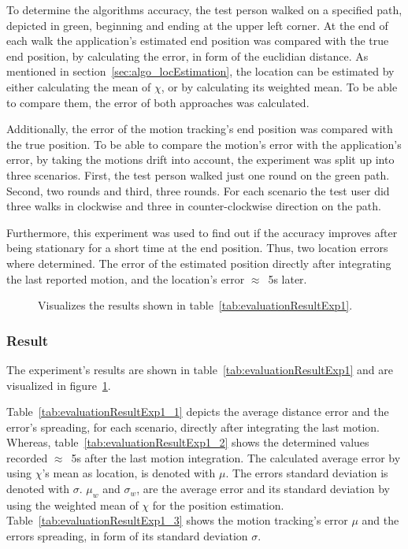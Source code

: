 To determine the algorithms accuracy, the test person walked on a specified path, depicted in green, beginning and ending at the upper left corner. At the end of each walk the application's estimated end position was compared with the true end position, by calculating the error, in form of the euclidian distance. As mentioned in section~\ref{sec:algo_locEstimation}, the location can be estimated by either calculating the mean of $\chi$, or by calculating its weighted mean. To be able to compare them, the error of both approaches was calculated.

Additionally, the error of the motion tracking's end position was compared with the true position. To be able to compare the motion's error with the application's error, by taking the motions drift into account, the experiment was split up into three scenarios. First, the test person walked just one round on the green path. Second, two rounds and third, three rounds. For each scenario the test user did three walks in clockwise and three in counter-clockwise direction on the path.

Furthermore, this experiment was used to find out if the accuracy improves after being stationary for a short time at the end position. Thus, two location errors where determined. The error of the estimated position directly after integrating the last reported motion, and the location's error $\approx$~5s later.


\begin{table}
	
	\caption{Depicts the results of experiment~1.}
	\label{tab:evaluationResultExp1}
\end{table}

\begin{figure}
	
	\caption{Visualizes the results shown in table~\ref{tab:evaluationResultExp1}.}
	\label{fig:exp1_visualization}
\end{figure}

\subsubsection*{Result}
The experiment's results are shown in table~\ref{tab:evaluationResultExp1} and are visualized in figure~\ref{fig:exp1_visualization}.

Table~\ref{tab:evaluationResultExp1_1} depicts the average distance error and the error's spreading, for each scenario, directly after integrating the last motion. Whereas, table~\ref{tab:evaluationResultExp1_2} shows the determined values recorded $\approx$~5s after the last motion integration. The calculated average error by using $\chi$'s mean as location, is denoted with $\mu$. The errors standard deviation is denoted with $\sigma$. $\mu_w$ and $\sigma_w$, are the average error and its standard deviation by using the weighted mean of $\chi$ for the position estimation.
Table~\ref{tab:evaluationResultExp1_3} shows the motion tracking's error $\mu$ and the errors spreading, in form of its standard deviation $\sigma$.

